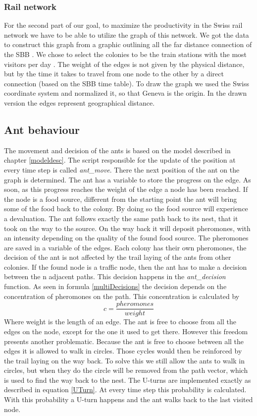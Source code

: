 \subsubsection{Rail network}
For the second part of our goal, to maximize the productivity in the Swiss rail network we have to be able to utilize the graph of this network. We got the data to construct this graph from a graphic outlining all the far distance connection of the SBB \citep{SbbStats2}. We chose to select the colonies to be the train stations with the most visitors per day \citep{SbbStats1}. The weight of the edges is not given by the physical distance, but by the time it takes to travel from one node to the other by a direct connection (based on the SBB time table)\citep{SbbStats3}. To draw the graph we used the Swiss coordinate system and normalized it, so that Geneva is the origin. In the drawn version the edges represent geographical distance.
\subsection{Ant behaviour}
The movement and decision of the ants is based on the model described in chapter \ref{modeldesc}. The script responsible for the update of the position at every time step is called \textit{ant\_move}. There the next position of the ant on the graph is determined. The ant has a variable to store the progress on the edge. As soon, as this progress reaches the weight of the edge a node has been reached. If the node is a food source, different from the starting point the ant will bring some of the food back to the colony. By doing so the food source will experience a devaluation. The ant follows exactly the same path back to its nest, that it took on the way to the source. On the way back it will deposit pheromones, with an intensity depending on the quality of the found food source. The pheromones are saved in a variable of the edges. Each colony has their own pheromones, the decision of the ant is not affected by the trail laying of the ants from other colonies.
If the found node is a traffic node, then the ant has to make a decision between the n adjacent paths. This decision happens in the \textit{ant\_decision} function. As seen in formula \ref{multiDecisions} the decision depends on the concentration of pheromones on the path. This concentration is calculated by
\begin{equation}
c = \frac{pheromones}{weight}
\end{equation}
Where weight is the length of an edge. The ant is free to choose from all the edges on the node, except for the one it used to get there.
However this freedom presents another problematic. Because the ant is free to choose between all the edges it is allowed to walk in circles. Those cycles would then be reinforced by the trail laying on the way back. To solve this we still allow the ants to walk in circles, but when they do the circle will be removed from the path vector, which is used to find the way back to the nest.
The U-turns are implemented exactly as described in equation \ref{UTurn}. At every time step this probability is calculated. With this probability a U-turn happens and the ant walks back to the last visited node. 

